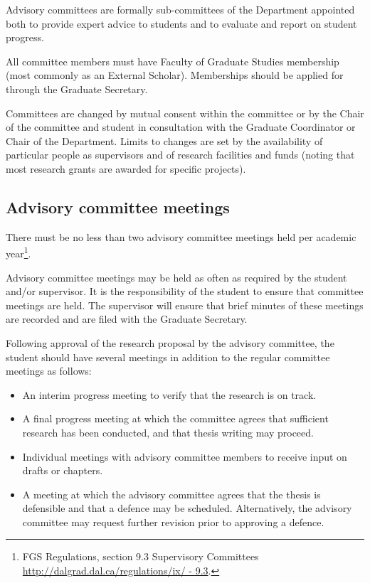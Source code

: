\documentclass{article}
\newcommand\elink[1]{\url{#1}}
\begin{document}

Advisory committees are formally sub-committees of the Department appointed
both to provide expert advice to students and to evaluate and report on student
progress.

All committee members must have Faculty of Graduate Studies membership (most
commonly as an External Scholar). Memberships should be applied for through the
Graduate Secretary.

Committees are changed by mutual consent within the committee or by the Chair
of the committee and student in consultation with the Graduate Coordinator or
Chair of the Department. Limits to changes are set by the availability of
particular people as supervisors and of research facilities and funds (noting
that most research grants are awarded for specific projects).

\subsection{Advisory committee meetings}

There must be no less than two advisory committee meetings held per academic
year\footnote{FGS Regulations, section 9.3 Supervisory Committees
\elink{http://dalgrad.dal.ca/regulations/ix/ - 9.3}.}.

Advisory committee meetings may be held as often as required by the student
and/or supervisor. It is the responsibility of the student to ensure that
committee meetings are held. The supervisor will ensure that brief minutes of
these meetings are recorded and are filed with the Graduate Secretary.

Following approval of the research proposal by the advisory committee, the
student should have several meetings in addition to the regular committee
meetings as follows:
\begin{itemize}

\item An interim progress meeting to verify that the research is on track.

\item A final progress meeting at which the committee agrees that sufficient
research has been conducted, and that thesis writing may proceed.

\item Individual meetings with advisory committee members to receive input on drafts or chapters.

\item A meeting at which the advisory committee agrees that the thesis is
defensible and that a defence may be scheduled. Alternatively, the advisory
committee may request further revision prior to approving a defence.

\end{itemize}
\end{document}
